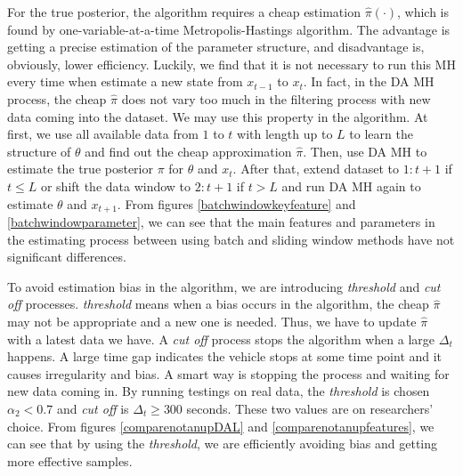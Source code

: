 For the true posterior, the algorithm requires a cheap estimation $\hat{\pi}(\cdot)$, which is found by one-variable-at-a-time Metropolis-Hastings algorithm. The advantage is getting a precise estimation of the parameter structure, and disadvantage is, obviously, lower efficiency. Luckily, we find that it is not necessary to run this MH every time when estimate a new state from $x_{t-1}$ to $x_t$. In fact, in the DA MH process, the cheap $\hat{\pi}$ does not vary too much in the filtering process with new data coming into the dataset. We may use this property in the algorithm. At first, we use all available data from $1$ to $t$ with length up to $L$ to learn the structure of $\theta$ and find out the cheap approximation $\hat{\pi}$. Then, use DA MH to estimate the true posterior $\pi$ for $\theta$ and $x_t$. After that, extend dataset to $1:t+1$ if $t\leq L$ or shift the data window to $2:t+1$ if $t>L$ and run DA MH again to estimate $\theta$ and $x_{t+1}$. From figures \ref{batchwindowkeyfeature} and \ref{batchwindowparameter}, we can see that the main features and parameters in the estimating process between using batch and sliding window methods have not significant differences. 


To avoid estimation bias in the algorithm, we are introducing \textit{threshold} and \textit{cut off} processes. \textit{threshold} means when a bias occurs in the algorithm, the cheap $\hat{\pi}$ may not be appropriate and a new one is needed. Thus, we have to update $\hat{\pi}$ with a latest data we have. A \textit{cut off} process stops the algorithm when a large $\Delta_t$ happens. A large time gap indicates the vehicle stops at some time point and it causes irregularity and bias. A smart way is stopping the process and waiting for new data coming in. By running testings on real data, the \textit{threshold} is chosen $\alpha_2<0.7$ and \textit{cut off} is $\Delta_t\geq 300$ seconds. These two values are on researchers' choice. From figures \ref{comparenotanupDAL} and \ref{comparenotanupfeatures}, we can see that by using the \textit{threshold}, we are efficiently avoiding bias and getting more effective samples. 


 
